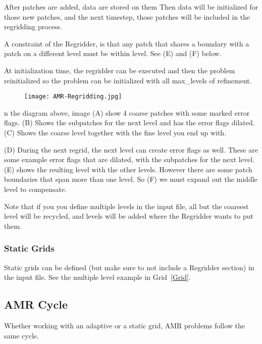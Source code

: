 After patches are added, data are stored on them Then data will be
initialized for those new patches, and the next timestep, those
patches will be included in the regridding process.

A constraint of the Regridder, is that any patch that shares a
boundary with a patch on a different level must be within level. See
(E) and (F) below.

At initialization time, the regridder can be executed and then the
problem reinitialized so the problem can be initialized with all
max\_levels of refinement.

\begin{figure}[h]
  \centering
  \texttt{[image: AMR-Regridding.jpg]}
  \caption{}
  \label{}
\end{figure}

n the diagram above, image (A) show 4 coarse patches with some marked
error flags. (B) Shows the subpatches for the next level and has the
error flags dilated. (C) Shows the coarse level together with the fine
level you end up with.

(D) During the next regrid, the next level can create error flags as
well. These are some example error flags that are dilated, with the
subpatches for the next level. (E) shows the reulting level with the
other levels. However there are some patch boundaries that span more
than one level. So (F) we must expand out the middle level to
compensate.

Note that if you you define multiple levels in the input file, all but
the coarsest level will be recycled, and levels will be added where
the Regridder wants to put them.

\subsubsection{Static Grids}

Static grids can be defined (but make sure to not include a Regridder
section) in the input file. See the multiple level example in
Grid~\ref{Grid}.

\subsection{AMR Cycle}

Whether working with an adaptive or a static grid, AMR problems follow
the same cycle. 

